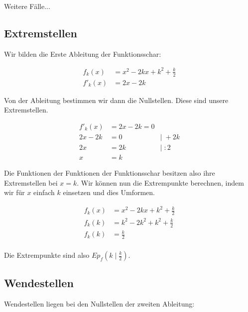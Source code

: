 \documentclass[12pt,a4paper]{article}
\begin{document}
Weitere Fälle...


\subsection{Extremstellen}

Wir bilden die Erste Ableitung der Funktionsschar:

\begin{equation}
    \label{eq:abl}
    \begin{aligned}
        f_k(x) &= x^2 - 2kx + k^2 + \frac{k}{2} \\
        f'_k(x) &= 2x - 2k
    \end{aligned}
\end{equation}

Von der Ableitung bestimmen wir dann die Nullstellen. Diese sind unsere Extremstellen.

\begin{equation}
    \label{eq:exs}
    \begin{aligned}
        f'_k(x) &= 2x - 2k = 0 \\
        2x - 2k &= 0 &|\; + 2k \\
        2x &= 2k &| \; :2 \\
        x &= k
    \end{aligned}
\end{equation}

Die Funktionen der Funktionen der Funktionsschar besitzen also ihre Extremstellen bei $x = k$. Wir können nun die Extrempunkte berechnen, indem wir für $x$ einfach $k$ einsetzen und dies Umformen.

\begin{equation}
    \label{eq:exp}
    \begin{aligned}
        f_k(x)&= x^2 - 2kx + k^2 + \frac{k}{2} \\
        f_k(k)&= k^2 - 2k^2 + k^2 + \frac{k}{2} \\
        f_k(k)&= \frac{k}{2} \\
    \end{aligned}
\end{equation}

Die Extrempunkte sind also $Ep_f(k \mid \frac{k}{2})$.

\subsection{Wendestellen}

Wendestellen liegen bei den Nullstellen der zweiten Ableitung:
\end{document}
